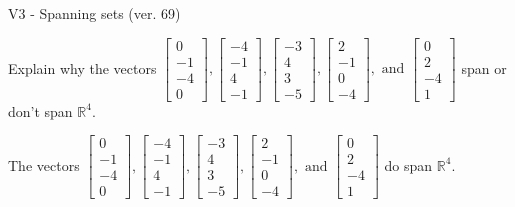 \begin{exercise}
  \begin{exerciseTitle}V3 - Spanning sets (ver. 69)\end{exerciseTitle}
  \begin{exerciseStatement}
    Explain why the vectors \(\left[\begin{array}{r}
0 \\
-1 \\
-4 \\
0
\end{array}\right] , \left[\begin{array}{r}
-4 \\
-1 \\
4 \\
-1
\end{array}\right] , \left[\begin{array}{r}
-3 \\
4 \\
3 \\
-5
\end{array}\right] , \left[\begin{array}{r}
2 \\
-1 \\
0 \\
-4
\end{array}\right] , \text{ and } \left[\begin{array}{r}
0 \\
2 \\
-4 \\
1
\end{array}\right]\) span or don't span \(\mathbb{R}^4\). 
	


  \end{exerciseStatement}
  \begin{exerciseAnswer}
   The vectors \(\left[\begin{array}{r}
0 \\
-1 \\
-4 \\
0
\end{array}\right] , \left[\begin{array}{r}
-4 \\
-1 \\
4 \\
-1
\end{array}\right] , \left[\begin{array}{r}
-3 \\
4 \\
3 \\
-5
\end{array}\right] , \left[\begin{array}{r}
2 \\
-1 \\
0 \\
-4
\end{array}\right] , \text{ and } \left[\begin{array}{r}
0 \\
2 \\
-4 \\
1
\end{array}\right]\) 
  	 do  
	span \(\mathbb{R}^4\).
  



\end{exerciseAnswer}
\end{exercise}
